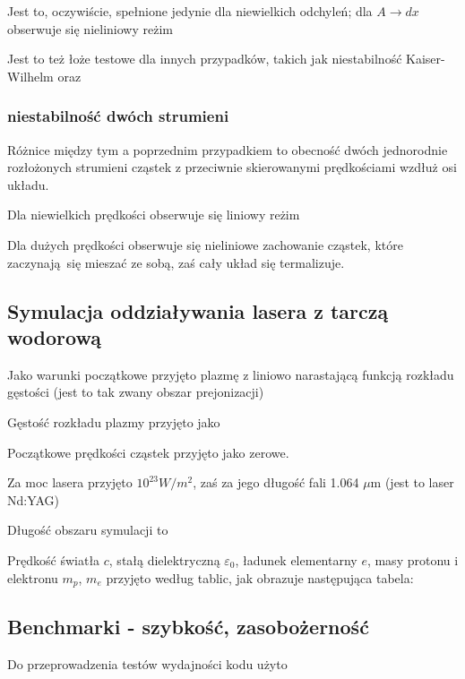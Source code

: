     Jest to, oczywiście, spełnione jedynie dla niewielkich odchyleń; dla $A \to dx$ %
    obserwuje się nieliniowy reżim %

    Jest to też łoże testowe %
    dla innych przypadków, takich jak niestabilność Kaiser-Wilhelm %
    oraz %
    \subsubsection{niestabilność dwóch strumieni} %
    Różnice między tym a poprzednim przypadkiem to obecność dwóch jednorodnie rozłożonych strumieni cząstek
    z przeciwnie skierowanymi prędkościami wzdłuż osi układu.

    Dla niewielkich prędkości %
    obserwuje się liniowy reżim %

    Dla dużych prędkości %
     obserwuje się nieliniowe zachowanie cząstek, które zaczynają się mieszać ze sobą, zaś cały układ się termalizuje.
    \subsection{Symulacja oddziaływania lasera z tarczą wodorową}

    Jako warunki początkowe przyjęto plazmę z liniowo narastającą funkcją rozkładu gęstości (jest to tak zwany obszar prejonizacji) %

    Gęstość rozkładu plazmy przyjęto jako

    Początkowe prędkości cząstek przyjęto jako zerowe. %

    Za moc lasera przyjęto $10^{23} W/m^2$, %
    zaś za jego długość fali 1.064 $\mu$m (jest to laser Nd:YAG)

    Długość obszaru symulacji to %

    Prędkość światła $c$, stałą dielektryczną $\varepsilon_0$, ładunek elementarny $e$, masy protonu i elektronu $m_p$, $m_e$ przyjęto według tablic,
    jak obrazuje następująca tabela:


    \subsection{Benchmarki - szybkość, zasobożerność} %
    Do przeprowadzenia testów wydajności kodu użyto %
